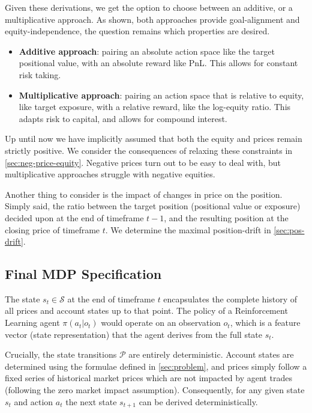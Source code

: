 Given these derivations, we get the option to choose between an additive, or a multiplicative approach. As shown, both approaches provide goal-alignment and equity-independence, the question remains which properties are desired.

\begin{itemize}
    \item \textbf{Additive approach}: pairing an absolute action space like the target positional value, with an absolute reward like PnL. This allows for constant risk taking.
    \item \textbf{Multiplicative approach}: pairing an action space that is relative to equity, like target exposure, with a relative reward, like the log-equity ratio. This adapts risk to capital, and allows for compound interest.
\end{itemize}  

Up until now we have implicitly assumed that both the equity and prices remain strictly positive. We consider the consequences of relaxing these constraints in \cref{sec:neg-price-equity}. Negative prices turn out to be easy to deal with, but multiplicative approaches struggle with negative equities. 

Another thing to consider is the impact of changes in price on the position. Simply said, the ratio between the target position (positional value or exposure) decided upon at the end of timeframe $t-1$, and the resulting position at the closing price of timeframe $t$. We determine the maximal position-drift in \cref{sec:pos-drift}.

\subsection{Final MDP Specification}

The state $s_t \in \mathcal{S}$ at the end of timeframe $t$ encapsulates the complete history of all prices and account states up to that point. The policy of a Reinforcement Learning agent $\pi(a_t|o_t)$ would operate on an observation $o_t$, which is a feature vector (state representation) that the agent derives from the full state $s_t$. 

Crucially, the state transitions $\mathcal{P}$ are entirely deterministic. Account states are determined using the formulae defined in \cref{sec:problem}, and prices simply follow a fixed series of historical market prices which are not impacted by agent trades (following the zero market impact assumption). Consequently, for any given state $s_t$ and action $a_t$ the next state $s_{t+1}$ can be derived deterministically.

